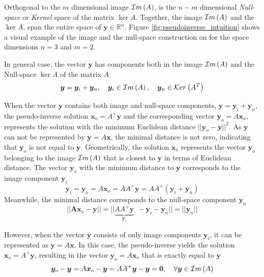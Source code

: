 
Orthogonal to the $m$ dimensional image $\mathcal{I}m\left(A\right)$, is the $n-m$ dimensional \textit{Null-space} or \textit{Kernel} space of the matrix $\ker{A}$. Together, the image $\mathcal{I}m\left(A\right)$ and the $\ker{A}$, span the entire space of $\bm{y}\in\mathbb{R}^n$.
Figure \ref{fig:pseudoinverse_intuition} shows a visual example of the image and the null-space construction on for the space dimensions $n=3$ and $m=2$.

In general case, the vector $\bm{y}$ has components both in the image $\mathcal{I}m\left(A\right)$ and the Null-space $\ker{A}$ of the matrix $A$
\begin{equation}
    \bm{y} = \bm{y}_i + \bm{y}_n, \quad \bm{y}_i\in\mathcal{I}m\left(A\right), \quad  \bm{y}_n\in\mathcal{K}er\left(A^T\right)
\end{equation}

When the vector $\bm{y}$ contains both image and null-space components, $\bm{y} = \bm{y}_i + \bm{y}_n$, the pseudo-inverse solution $\bm{x}_o = A^+\bm{y}$ and the corresponding vector $\bm{y}_o = A\bm{x}_o$, represents the solution with the minimum Euclidean distance $||\bm{y}_o - \bm{y}||^2$. As $\bm{y}$ can not be represented by $\bm{y}=A\bm{x}$, the minimal distance is not zero, indicating that $\bm{y}_o$ is not equal to $\bm{y}$. Geometrically, the solution $\bm{x}_o$ represents the vector $\bm{y}_o$ belonging to the image $\mathcal{I}m\left(A\right)$ that is closest to $\bm{y}$ in terms of Euclidean distance. The vector $\bm{y}_o$ with the minimum distance to $\bm{y}$ corresponds to the image component $\bm{y}_i$
\begin{equation}
\bm{y}_i = \bm{y}_o= A\bm{x}_o = AA^+\bm{y}=AA^+(\bm{y}_i + \bm{y}_n)
\end{equation}
Meanwhile, the minimal distance corresponds to the null-space component $\bm{y}_n$
\begin{equation}
||\bm{A}\bm{x}_o - \bm{y}|| = ||\underbrace{AA^+\bm{y}}_{\bm{y}_i} ~~ - \bm{y}_i - \bm{y}_n ||= ||\bm{y}_n ||
\end{equation}

However, when the vector $\bm{y}$ consists of only image components $\bm{y}_i$, it can be represented as $\bm{y} = A\bm{x}$. In this case, the pseudo-inverse yields the solution $\bm{x}_o = A^+\bm{y}$, resulting in the vector $\bm{y}_o = A\bm{x}_o$ that is exactly equal to $\bm{y}$
\begin{equation}
\bm{y}_o-\bm{y} = A\bm{x}_o -\bm{y} = AA^+\bm{y} - \bm{y} =\bm{0}, \quad \forall\bm{y}\in\mathcal{I}m\left(A\right)
\end{equation}

